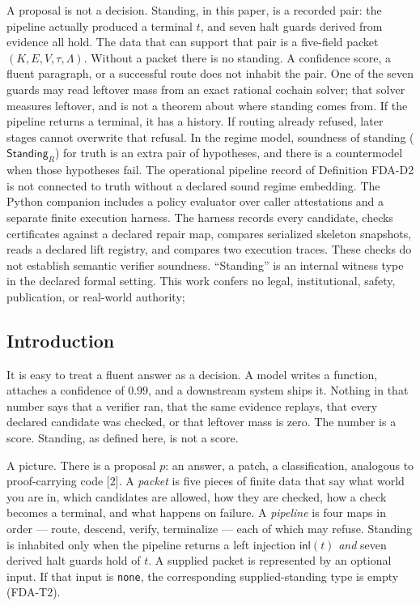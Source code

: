 \documentclass[
  11pt,
]{article}
\begin{document}
A proposal is not a decision. Standing, in this paper, is a recorded pair: the pipeline actually produced a terminal \(t\), and seven halt guards derived from evidence all hold. The data that can support that pair is a five-field packet \((K,E,V,\tau,\Lambda)\). Without a packet there is no standing. A confidence score, a fluent paragraph, or a successful route does not inhabit the pair. One of the seven guards may read leftover mass from an exact rational cochain solver; that solver measures leftover, and is not a theorem about where standing comes from. If the pipeline returns a terminal, it has a history. If routing already refused, later stages cannot overwrite that refusal. In the regime model, soundness of standing (\(\mathsf{Standing}_R\)) for truth is an extra pair of hypotheses, and there is a countermodel when those hypotheses fail. The operational pipeline record of Definition FDA-D2 is not connected to truth without a declared sound regime embedding. The Python companion includes a policy evaluator over caller attestations and a separate finite execution harness. The harness records every candidate, checks certificates against a declared repair map, compares serialized skeleton snapshots, reads a declared lift registry, and compares two execution traces. These checks do not establish semantic verifier soundness. ``Standing'' is an internal witness type in the declared formal setting. This work confers no legal, institutional, safety, publication, or real-world authority;

\subsection{Introduction}\label{introduction}

It is easy to treat a fluent answer as a decision. A model writes a function, attaches a confidence of \(0.99\), and a downstream system ships it. Nothing in that number says that a verifier ran, that the same evidence replays, that every declared candidate was checked, or that leftover mass is zero. The number is a score. Standing, as defined here, is not a score.

A picture. There is a proposal \(p\): an answer, a patch, a classification, analogous to proof-carrying code {[}2{]}. A \emph{packet} is five pieces of finite data that say what world you are in, which candidates are allowed, how they are checked, how a check becomes a terminal, and what happens on failure. A \emph{pipeline} is four maps in order --- route, descend, verify, terminalize --- each of which may refuse. Standing is inhabited only when the pipeline returns a left injection \(\mathsf{inl}(t)\) \emph{and} seven derived halt guards hold of \(t\). A supplied packet is represented by an optional input. If that input is \texttt{none}, the corresponding supplied-standing type is empty (FDA-T2).
\end{document}
